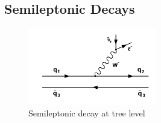\documentclass[a4paper,10pt]{article}
\numberwithin{equation}{section}
\begin{document}
\subsection{Semileptonic Decays}
\label{sec:cp}

\begin{figure}
  \begin{center}
  \vspace{-25pt}
    \includegraphics[width=
   0.5\textwidth]{semileptonic.png}
     \vspace{-25pt}
  \end{center}
  \caption{Semileptonic decay at tree level}
  \vspace{+10pt}
  \label{fig:semileptonic}
\end{figure}
\end{document}
